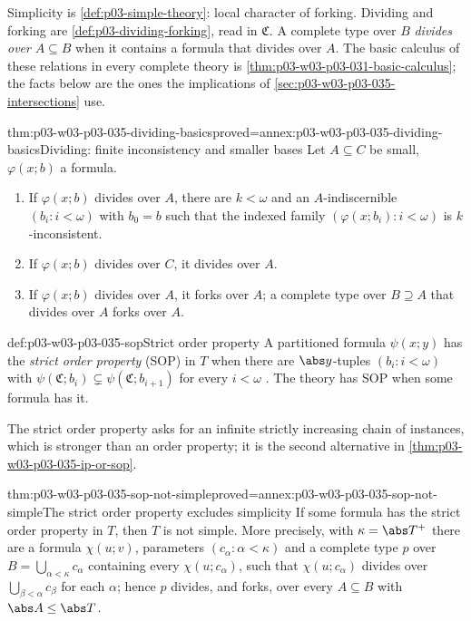 Simplicity is \cref{def:p03-simple-theory}: local character of forking.
Dividing and forking are \cref{def:p03-dividing-forking}, read in
\(\mathfrak C\).  A complete type over \(B\) \emph{divides over}
\(A\subseteq B\) when it contains a formula that divides over \(A\).  The
basic calculus of these relations in every complete theory is
\cref{thm:p03-w03-p03-031-basic-calculus}; the facts below are the ones the
implications of \cref{sec:p03-w03-p03-035-intersections} use.

\begin{hblemma}{thm:p03-w03-p03-035-dividing-basics}{proved=annex:p03-w03-p03-035-dividing-basics}{Dividing: finite inconsistency and smaller bases}
Let \(A\subseteq C\) be small, \(\varphi(x;b)\) a formula.
\begin{enumerate}
  \item If \(\varphi(x;b)\) divides over \(A\), there are \(k<\omega\) and an
        \(A\)-indiscernible \((b_i:i<\omega)\) with \(b_0=b\) such that the
        indexed family \((\varphi(x;b_i):i<\omega)\) is \(k\)-inconsistent.
  \item If \(\varphi(x;b)\) divides over \(C\), it divides over \(A\).
  \item If \(\varphi(x;b)\) divides over \(A\), it forks over \(A\); a
        complete type over \(B\supseteq A\) that divides over \(A\) forks over
        \(A\).
\end{enumerate}
\end{hblemma}

\begin{hbdefinition}{def:p03-w03-p03-035-sop}{Strict order property}
A partitioned formula \(\psi(x;y)\) has the \emph{strict order property}
(SOP) in \(T\) when there are \(\abs y\)-tuples \((b_i:i<\omega)\) with
\(\psi(\mathfrak C;b_i)\subsetneq\psi(\mathfrak C;b_{i+1})\) for every
\(i<\omega\) \cite[Definition~2.65, p.~33]{Simon2015GuideManuscript}.  The
theory has SOP when some formula has it.
\end{hbdefinition}

The strict order property asks for an infinite strictly increasing chain of
instances, which is stronger than an order property; it is the second
alternative in \cref{thm:p03-w03-p03-035-ip-or-sop}.

\begin{hbtheorem}{thm:p03-w03-p03-035-sop-not-simple}{proved=annex:p03-w03-p03-035-sop-not-simple}{The strict order property excludes simplicity}
If some formula has the strict order property in \(T\), then \(T\) is not
simple.  More precisely, with \(\kappa=\abs T^+\) there are a formula
\(\chi(u;v)\), parameters \((c_\alpha:\alpha<\kappa)\) and a complete type
\(p\) over \(B=\bigcup_{\alpha<\kappa}c_\alpha\) containing every
\(\chi(u;c_\alpha)\), such that \(\chi(u;c_\alpha)\) divides over
\(\bigcup_{\beta<\alpha}c_\beta\) for each \(\alpha\); hence \(p\) divides,
and forks, over every \(A\subseteq B\) with \(\abs A\leq\abs T\).
\end{hbtheorem}

